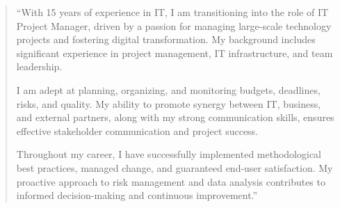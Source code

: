\documentclass[10pt,a4paper,ragged2e,withhyper,normalphoto]{altacv}
\begin{document}


\makecvheader


\begin{quote}
``With 15 years of experience in IT, I am transitioning into the role of IT Project Manager, driven by a passion for managing large-scale technology projects and fostering digital transformation. My background includes significant experience in project management, IT infrastructure, and team leadership.

I am adept at planning, organizing, and monitoring budgets, deadlines, risks, and quality. My ability to promote synergy between IT, business, and external partners, along with my strong communication skills, ensures effective stakeholder communication and project success.

Throughout my career, I have successfully implemented methodological best practices, managed change, and guaranteed end-user satisfaction. My proactive approach to risk management and data analysis contributes to informed decision-making and continuous improvement.''
\end{quote}

\bigskip

\end{document}
